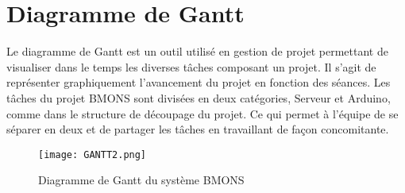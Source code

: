 \clearpage

\section{Diagramme de Gantt}
\vspace{1.5cm}
Le diagramme de Gantt est un outil utilisé en gestion de projet permettant de visualiser dans le temps les diverses tâches composant un projet. Il s'agit de représenter graphiquement l'avancement du projet en fonction des séances. Les tâches du projet BMONS sont divisées en deux catégories, Serveur et Arduino, comme dans le structure de découpage du projet. Ce qui permet à l'équipe de se séparer en deux et de partager les tâches en travaillant de façon concomitante.
\vspace{1.5cm}
\begin{figure}[h!]
\centering\texttt{[image: GANTT2.png]}
\caption{\label{fig:GANTT} Diagramme de Gantt du système BMONS}
\end{figure}


